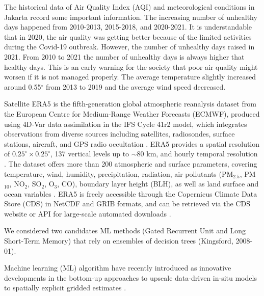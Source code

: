 \documentclass[pdflatex,sn-mathphys-num]{sn-jnl}%
\theoremstyle{thmstyleone}%
\theoremstyle{thmstyletwo}%
\theoremstyle{thmstylethree}%
\begin{document}
	The historical data of Air Quality Index (AQI) and meteorological conditions in Jakarta record some important information. The increasing number of unhealthy days happened from 2010-2013, 2015-2018, and 2020-2021. It is understandable that in 2020, the air quality was getting better because of the limited activities during the Covid-19 outbreak. However, the number of unhealthy days raised in 2021. From 2010 to 2021 the number of unhealthy days is always higher that healthy days. This is an early warning for the society that poor air quality might worsen if it is not managed properly. The average temperature slightly increased around 0.55$^\circ$ from 2013 to 2019 and the average wind speed decreased.

Satellite
ERA5 is the fifth-generation global atmospheric reanalysis dataset from the 
European Centre for Medium-Range Weather Forecasts (ECMWF), produced using 
4D-Var data assimilation in the IFS Cycle 41r2 model, which integrates 
observations from diverse sources including satellites, radiosondes, surface 
stations, aircraft, and GPS radio occultation \cite{hersbach2020, copernicus2023}. 
ERA5 provides a spatial resolution of $0.25^\circ \times 0.25^\circ$, 137 
vertical levels up to $\sim$80 km, and hourly temporal resolution \cite{hersbach2020}. 
The dataset offers more than 200 atmospheric and surface parameters, covering 
temperature, wind, humidity, precipitation, radiation, air pollutants 
(PM$_{2.5}$, PM$_{10}$, NO$_2$, SO$_2$, O$_3$, CO), 
boundary layer height (BLH), as well as land surface and ocean variables 
\cite{hersbach2020, bell2021}. ERA5 is freely accessible through the Copernicus 
Climate Data Store (CDS) in NetCDF and GRIB formats, and can be retrieved via 
the CDS website or API for large-scale automated downloads \cite{copernicus2023}.

We considered two candidates ML methods (Gated Recurrent Unit and Long Short-Term Memory) that rely on ensembles of decision trees (Kingsford, 2008-01). 

Machine learning (ML) algorithm have recently introduced as innovative developments in the bottom-up approaches to upscale data-driven in-situ models to spatially explicit gridded estimates \cite{Son2023}.
\end{document}
